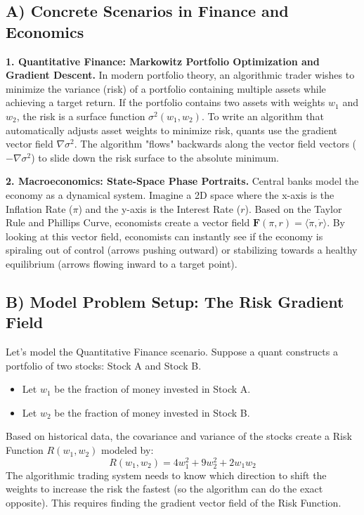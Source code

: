 \documentclass[11pt]{article}
\begin{document}
\subsection{A) Concrete Scenarios in Finance and Economics}
\textbf{1. Quantitative Finance: Markowitz Portfolio Optimization and Gradient Descent.}
In modern portfolio theory, an algorithmic trader wishes to minimize the variance (risk) of a portfolio containing multiple assets while achieving a target return. If the portfolio contains two assets with weights $w_1$ and $w_2$, the risk is a surface function $\sigma^2(w_1, w_2)$. To write an algorithm that automatically adjusts asset weights to minimize risk, quants use the gradient vector field $\nabla \sigma^2$. The algorithm "flows" backwards along the vector field vectors ($-\nabla \sigma^2$) to slide down the risk surface to the absolute minimum.

\textbf{2. Macroeconomics: State-Space Phase Portraits.}
Central banks model the economy as a dynamical system. Imagine a 2D space where the x-axis is the Inflation Rate ($\pi$) and the y-axis is the Interest Rate ($r$). Based on the Taylor Rule and Phillips Curve, economists create a vector field $\mathbf{F}(\pi, r) = \langle \dot{\pi}, \dot{r} \rangle$. By looking at this vector field, economists can instantly see if the economy is spiraling out of control (arrows pushing outward) or stabilizing towards a healthy equilibrium (arrows flowing inward to a target point).

\subsection{B) Model Problem Setup: The Risk Gradient Field}
Let's model the Quantitative Finance scenario.
Suppose a quant constructs a portfolio of two stocks: Stock A and Stock B.
\begin{itemize}
    \item Let $w_1$ be the fraction of money invested in Stock A.
    \item Let $w_2$ be the fraction of money invested in Stock B.
\end{itemize}
Based on historical data, the covariance and variance of the stocks create a Risk Function $R(w_1, w_2)$ modeled by:
\[ R(w_1, w_2) = 4w_1^2 + 9w_2^2 + 2w_1w_2 \]
The algorithmic trading system needs to know which direction to shift the weights to increase the risk the fastest (so the algorithm can do the exact opposite). This requires finding the gradient vector field of the Risk Function.
\end{document}
